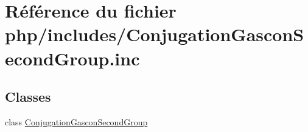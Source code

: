 \hypertarget{_conjugation_gascon_second_group_8inc}{}\section{Référence du fichier php/includes/\+Conjugation\+Gascon\+Second\+Group.inc}
\label{_conjugation_gascon_second_group_8inc}
\subsection*{Classes}
\begin{DoxyCompactItemize}
\item 
class \hyperlink{class_conjugation_gascon_second_group}{Conjugation\+Gascon\+Second\+Group}
\end{DoxyCompactItemize}
